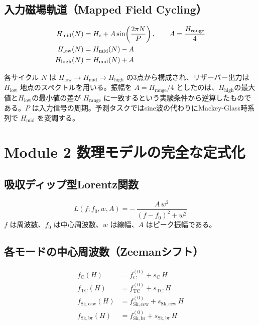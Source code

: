 \documentclass[11pt,a4paper]{ltjsarticle}
\begin{document}
\subsection{入力磁場軌道（Mapped Field Cycling）}

\begin{align}
H_\mathrm{mid}(N) &= H_\mathrm{c} + A\sin\!\left(\frac{2\pi N}{P}\right), \qquad A = \frac{H_\mathrm{range}}{4} \notag\\
H_\mathrm{low}(N) &= H_\mathrm{mid}(N) - A \notag\\
H_\mathrm{high}(N) &= H_\mathrm{mid}(N) + A
\label{eq:mfc}
\end{align}

各サイクル $N$ は $H_\mathrm{low}\to H_\mathrm{mid}\to H_\mathrm{high}$ の3点から構成され、リザーバー出力は $H_\mathrm{low}$ 地点のスペクトルを用いる。振幅を $A=H_\mathrm{range}/4$ としたのは、$H_\mathrm{high}$の最大値と$H_\mathrm{low}$の最小値の差が $H_\mathrm{range}$ に一致するという実験条件から逆算したものである。$P$ は入力信号の周期。予測タスクではsine波の代わりにMackey-Glass時系列で $H_\mathrm{mid}$ を変調する。

\section{Module 2 数理モデルの完全な定式化}\label{app:module2}

\subsection{吸収ディップ型Lorentz関数}

\begin{equation}
L(f; f_0, w, A) = -\,\frac{A\,w^2}{(f - f_0)^2 + w^2}
\label{eq:lorentz}
\end{equation}
$f$ は周波数、$f_0$ は中心周波数、$w$ は線幅、$A$ はピーク振幅である。

\subsection{各モードの中心周波数（Zeemanシフト）}

\begin{align}
f_\mathrm{C}(H) &= f_\mathrm{C}^{(0)} + s_\mathrm{C}\, H \\
f_\mathrm{TC}(H) &= f_\mathrm{TC}^{(0)} + s_\mathrm{TC}\, H \\
f_\mathrm{Sk,ccw}(H) &= f_\mathrm{Sk,ccw}^{(0)} + s_\mathrm{Sk,ccw}\, H \\
f_\mathrm{Sk,br}(H) &= f_\mathrm{Sk,br}^{(0)} + s_\mathrm{Sk,br}\, H
\end{align}
\end{document}
